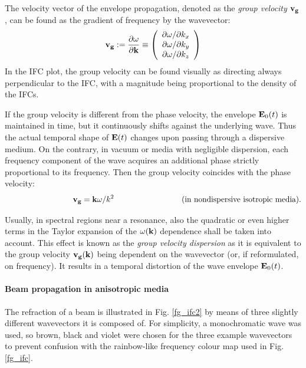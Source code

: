 The velocity vector of the envelope propagation, denoted as the \textit{group velocity} ${\mathbf{v_g}}$, can be found \cite{mikki2009electromagnetic} as the gradient of frequency by the wavevector: 
\begin{equation} {\mathbf{v_g}} := \frac{\partial \omega}{\partial {\mathbf{k}}} \equiv 
\left(\begin{array}{c} 
	\partial \omega/\partial k_x \\ 
	\partial \omega/\partial k_y \\ 
	\partial \omega/\partial k_z \\ 
	\end{array} \right)
 \label{eq_vg}\end{equation}
In the IFC plot, the group velocity can be found visually as directing always perpendicular to the IFC, with a magnitude being proportional to the density of the IFCs.

If the group velocity is different from the phase velocity, the envelope $\mathbf{E}_0(t)$ is maintained in time, but it continuously shifts against the underlying wave. Thus the actual temporal shape of $\mathbf{E}(t)$ changes upon passing through a dispersive medium.
On the contrary, in vacuum or media with negligible dispersion, each frequency component of the wave acquires an additional phase strictly proportional to its frequency. Then the group velocity coincides with the phase velocity: 
$$\hspace{3cm}\vg = \kk \omega / k^2 \hspace{3cm} \text{(in nondispersive isotropic media)}.$$

Usually, in spectral regions near a resonance, also the quadratic or even higher terms in the Taylor expansion of the $\omega({\mathbf{k}})$ dependence shall be taken into account. This effect is known as the \textit{group velocity dispersion} as it is equivalent to the group velocity ${\mathbf{v_g}}({\mathbf{k}})$ being dependent on the wavevector (or, if reformulated, on frequency). It results in a temporal distortion of the wave envelope $\mathbf{E}_0(t)$.  %
\paragraph{Beam propagation in anisotropic media}  %
The refraction of a beam is illustrated in Fig. \ref{fg_ifc2} by means of three slightly different wavevectors it is composed of. For simplicity, a monochromatic wave was used, so brown, black and violet were chosen for the three example wavevectors to prevent confusion with the rainbow-like frequency colour map used in Fig. \ref{fg_ifc}. 

